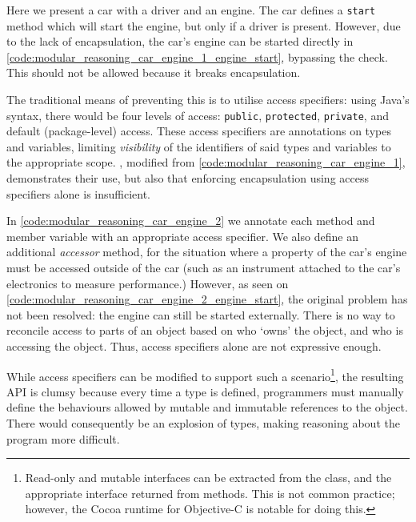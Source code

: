 \documentclass{acm_proc_article-sp}
\begin{document}


Here we present a car with a driver and an engine. The car defines a
\lstinline|start| method which will start the engine, but only if a driver is
present. However, due to the lack of encapsulation, the car's engine can be
started directly in \cref{code:modular_reasoning_car_engine_1_engine_start},
bypassing the check. This should not be allowed because it breaks
encapsulation.

The traditional means of preventing this is to utilise access specifiers: using
Java's syntax, there would be four levels of access: \lstinline|public|,
\lstinline|protected|, \lstinline|private|, and default (package-level) access.
These access specifiers are annotations on types and variables, limiting
\emph{visibility} of the identifiers of said types and variables to the
appropriate scope. , modified from
\cref{code:modular_reasoning_car_engine_1}, demonstrates their use, but also
that enforcing encapsulation using access specifiers alone is insufficient.



In \cref{code:modular_reasoning_car_engine_2} we annotate each method
and member variable with an appropriate access specifier. We also define an
additional \emph{accessor} method, for the situation where a property of the
car's engine must be accessed outside of the car (such as an instrument
attached to the car's electronics to measure performance.) However, as seen on
\cref{code:modular_reasoning_car_engine_2_engine_start}, the original
problem has not been resolved: the engine can still be started externally.
There is no way to reconcile access to parts of an object based on who `owns'
the object, and who is accessing the object. Thus, access specifiers alone are
not expressive enough.

While access specifiers can be modified to support such a
scenario\footnote{Read-only and mutable interfaces can be extracted from the
class, and the appropriate interface returned from methods. This is not common
practice; however, the Cocoa runtime for Objective-C is notable for doing
this.}, the resulting API is clumsy because every time a type is defined,
programmers must manually define the behaviours allowed by mutable and
immutable references to the object. There would consequently be an explosion of
types, making reasoning about the program more difficult.
\end{document}
